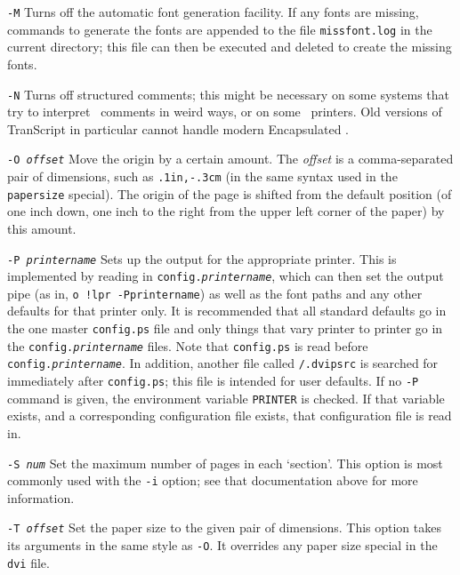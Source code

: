 \begin{list}
\item [\tt -M]
Turns off the automatic font generation facility.  If any fonts are
missing, commands to generate the fonts are appended to the file
{\tt missfont.log} in the current directory; this file can then be
executed and deleted to create the missing fonts.

\item [\tt -N]
Turns off structured comments; this might be necessary on some systems
that try to interpret \PS\ comments in weird ways, or on some
\PS\ printers.  Old versions of TranScript in particular cannot
handle modern Encapsulated \PS .

\item [\tt -O \em offset]
Move the origin by a certain amount.  The {\it offset} is a comma-separated
pair of dimensions, such as {\tt .1in,-.3cm} (in the same syntax used in
the {\tt papersize} special).   The origin of the page is shifted from the
default position (of one inch down, one inch to the right from the upper
left corner of the paper) by this amount.

\item [\tt -P \em printername]
Sets up the output for the appropriate printer.  This is implemented
by reading in {\tt config.{\it printername}}, which can then set the output pipe
(as in, {\tt o !lpr -Pprintername}) as well as the font paths and any other
defaults for that printer only.  It is recommended that all standard
defaults go in the one master {\tt config.ps}
file and only things that vary
printer to printer go in the {\tt config.{\it printername}}
files.  Note that {\tt config.ps}
is read before {\tt config.{\it printername}}.
In addition, another file called {\tt \tilde/.dvipsrc}
is searched for immediately after {\tt config.ps};
this file is intended for user defaults.  If no {\tt -P} command is
given, the environment variable {\tt PRINTER} is checked.  If that
variable exists, and a corresponding configuration
file exists, that configuration file is read in.

\item [\tt -S \em num]
Set the maximum number of pages in each `section'.  This option is most
commonly used with the {\tt -i} option; see that documentation above for more
information.

\item [\tt -T \em offset]
Set the paper size to the given pair of dimensions.  This option takes
its arguments in the same style as {\tt -O}.  It overrides any paper
size special in the {\tt dvi} file.


\end{list}
